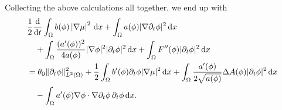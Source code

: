 \documentclass[11pt,reqno]{amsart}
\theoremstyle{remark}
\def\d{{\rm d}}
\def\uu{\boldsymbol{u}}
\def\ddt{\frac{\d}{\d t}}
\numberwithin{equation}{section}
\def\d{{\rm d}}
\begin{document}
Collecting the above calculations all together, we end up with
\begin{align}
\label{first-rel}
&\frac{1}{2} \ddt  \int_{\Omega} b(\phi) \left|\nabla \mu \right|^2 \, \d x
+\int_\Omega a(\phi) |\nabla \partial_t \phi|^2 \, \d x
\notag \\
&\quad +
 \int_\Omega \frac{(a'(\phi))^2}{4 a(\phi)} |\nabla \phi|^2 |\partial_t \phi|^2 \, \d x + \int_\Omega F''(\phi)|\partial_t \phi|^2 \, \d x
\notag\\
&= \theta_0 \| \partial_t \phi\|_{L^2(\Omega)}^2
+ \frac{1}{2}  \int_{\Omega} b'(\phi) \partial_t \phi  |\nabla \mu|^2 \, \d x
+ \int_\Omega \frac{a'(\phi)}{2\sqrt{a(\phi)}} \Delta A(\phi) |\partial_t \phi|^2 \, \d x
\notag\\
&\quad
-  \int_\Omega a'(\phi) \nabla \phi \cdot \nabla \partial_t \phi \, \partial_t \phi \, \d x.
\end{align}
\end{document}
